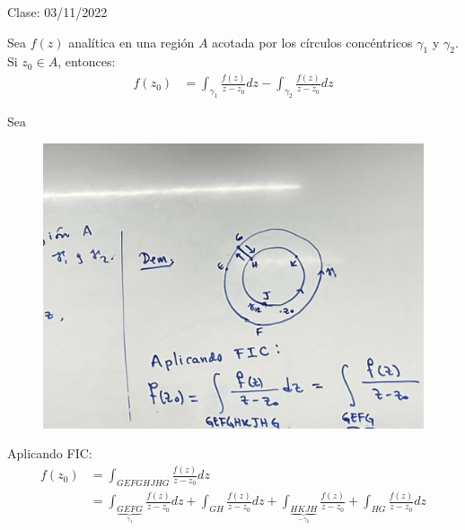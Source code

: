 Clase: 03/11/2022

\begin{lema}
    Sea $f(z)$ analítica en una región $A$ acotada por los círculos concéntricos $\gamma_1$ y $\gamma_2$. Si $z_0\in A$, entonces:
    \begin{align*}
        f(z_0) &= \int_{\gamma_1}\frac{f(z)}{z-z_0}dz-\int_{\gamma_2}\frac{f(z)}{z-z_0}dz
    \end{align*}
    \begin{dem}
        Sea 

        \begin{figure}[H]
            \centering
            \includegraphics[scale=0.2]{imagenes/24.1.jpeg}
        \end{figure}
        Aplicando FIC: 
        \begin{align*}
            f(z_0) &= \int_{GEFGHJHG} \frac{f(z)}{z-z_0}dz\\
                   &= \int_{\underbrace{GEFG}_{\gamma_1}}\frac{f(z)}{z-z_0}dz+\int_{GH}\frac{f(z)}{z-z_0}dz+\int_{\underbrace{HKJH}_{-\gamma_2}}\frac{f(z)}{z-z_0}+\int_{HG}\frac{f(z)}{z-z_0}dz
        \end{align*}
    \end{dem}
\end{lema}

